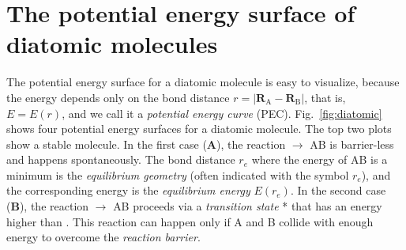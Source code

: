 \documentclass[../Main/notes.tex]{subfiles}
\begin{document}
\section{The potential energy surface of diatomic molecules}

The potential energy surface for a diatomic molecule  is easy to visualize, because the energy depends only on the bond distance $r = |\mathbf{R}_\mathrm{A} - \mathbf{R}_\mathrm{B}|$, that is, $E = E(r)$, and we call it a \emph{potential energy curve} (PEC).
Fig.~\ref{fig:diatomic} shows four potential energy surfaces for a diatomic molecule.
The top two plots show a stable  molecule.
In the first case (\textbf{A}), the reaction  $\rightarrow$ {AB} is barrier-less and happens spontaneously.
The bond distance $r_e$ where the energy of AB is a minimum is the \emph{equilibrium geometry} (often indicated with the symbol $r_e$), and the corresponding energy is the \emph{equilibrium energy} $E(r_e)$.
In the second case  (\textbf{B}),  the reaction  $\rightarrow$ {AB} proceeds via a \emph{transition state} * that has an energy higher than .
This reaction can happen only if A and B collide with enough energy to overcome the \emph{reaction barrier}.
\end{document}
